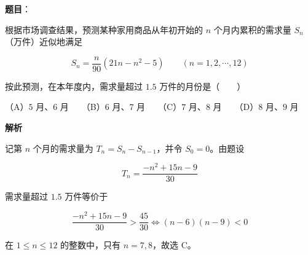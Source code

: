 \begin{answer}

\textbf{题目}：

根据市场调查结果，预测某种家用商品从年初开始的 $n$ 个月内累积的需求量 $S_n$（万件）近似地满足

\nopagebreak[4]
\[
S_n=\frac n{90}(21n-n^2-5)\qquad(n=1,2,\cdots,12)
\]

按此预测，在本年度内，需求量超过 $1.5$ 万件的月份是\mbox{（　　）}

（A）$5$ 月、$6$ 月　　（B）$6$ 月、$7$ 月　　（C）$7$ 月、$8$ 月　　（D）$8$ 月、$9$ 月

\textbf{解析}

记第 $n$ 个月的需求量为 $T_n=S_n-S_{n-1}$，并令 $S_0=0$。由题设

\nopagebreak[4]
\[
T_n=\frac{-n^2+15n-9}{30}
\]

需求量超过 $1.5$ 万件等价于

\nopagebreak[4]
\[
\frac{-n^2+15n-9}{30}>\frac{45}{30}
\Longleftrightarrow
(n-6)(n-9)<0
\]

在 $1\le n\le12$ 的整数中，只有 $n=7,8$，故选 C。


\end{answer}

